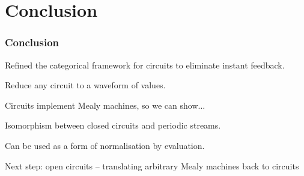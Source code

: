 \section{Conclusion}

\begin{frame}
    \frametitle{Conclusion}

    Refined the \alert{categorical framework} for circuits to eliminate \alert{instant feedback}.

    \pause

    Reduce \alert{any} circuit to a \alert{waveform} of values. 

    \pause

    Circuits implement \alert{Mealy machines}, so we can show...

    \pause

    Isomorphism between \alert{closed circuits} and \alert{periodic streams}.

    \pause

    Can be used as a form of \alert{normalisation by evaluation}.

    \pause

    Next step: \alert{open circuits} -- translating arbitrary Mealy machines back to circuits

\end{frame}